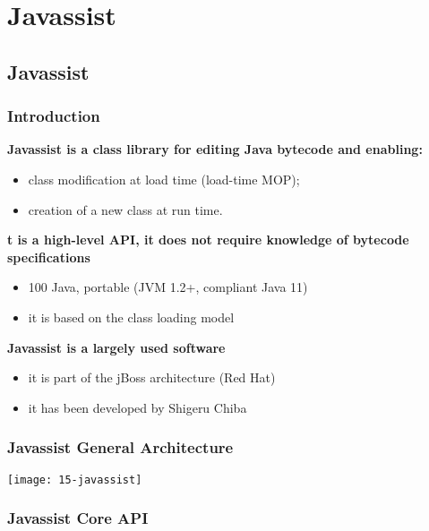  \section{Javassist}

\subsection{Javassist}

\subsubsection{Introduction}

\textbf{Javassist is a class library for editing Java bytecode and enabling:}

\begin{itemize}
	\item class modification at load time (load-time MOP);
	\item creation of a new class at run time.
\end{itemize}

\textbf{t is a high-level API, it does not require knowledge of bytecode specifications}

\begin{itemize}
	\item 100 Java, portable (JVM 1.2+, compliant Java 11)
	\item it is based on the class loading model
\end{itemize}

\textbf{Javassist is a largely used software}

\begin{itemize}
	\item it is part of the jBoss architecture (Red Hat)
	\item it has been developed by Shigeru Chiba
\end{itemize}

\subsubsection{Javassist General Architecture}

\begin{center}
\texttt{[image: 15-javassist]}
\end{center}

\subsubsection{Javassist Core API}

